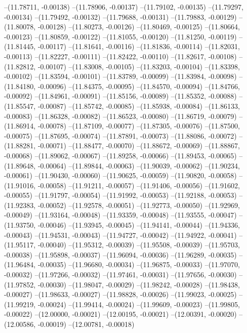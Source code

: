 --(11.78711, -0.00138)
--(11.78906, -0.00137)
--(11.79102, -0.00135)
--(11.79297, -0.00134)
--(11.79492, -0.00132)
--(11.79688, -0.00131)
--(11.79883, -0.00129)
--(11.80078, -0.00128)
--(11.80273, -0.00126)
--(11.80469, -0.00125)
--(11.80664, -0.00123)
--(11.80859, -0.00122)
--(11.81055, -0.00120)
--(11.81250, -0.00119)
--(11.81445, -0.00117)
--(11.81641, -0.00116)
--(11.81836, -0.00114)
--(11.82031, -0.00113)
--(11.82227, -0.00111)
--(11.82422, -0.00110)
--(11.82617, -0.00108)
--(11.82812, -0.00107)
--(11.83008, -0.00105)
--(11.83203, -0.00104)
--(11.83398, -0.00102)
--(11.83594, -0.00101)
--(11.83789, -0.00099)
--(11.83984, -0.00098)
--(11.84180, -0.00096)
--(11.84375, -0.00095)
--(11.84570, -0.00094)
--(11.84766, -0.00092)
--(11.84961, -0.00091)
--(11.85156, -0.00089)
--(11.85352, -0.00088)
--(11.85547, -0.00087)
--(11.85742, -0.00085)
--(11.85938, -0.00084)
--(11.86133, -0.00083)
--(11.86328, -0.00082)
--(11.86523, -0.00080)
--(11.86719, -0.00079)
--(11.86914, -0.00078)
--(11.87109, -0.00077)
--(11.87305, -0.00076)
--(11.87500, -0.00075)
--(11.87695, -0.00074)
--(11.87891, -0.00073)
--(11.88086, -0.00072)
--(11.88281, -0.00071)
--(11.88477, -0.00070)
--(11.88672, -0.00069)
--(11.88867, -0.00068)
--(11.89062, -0.00067)
--(11.89258, -0.00066)
--(11.89453, -0.00065)
--(11.89648, -0.00064)
--(11.89844, -0.00063)
--(11.90039, -0.00062)
--(11.90234, -0.00061)
--(11.90430, -0.00060)
--(11.90625, -0.00059)
--(11.90820, -0.00058)
--(11.91016, -0.00058)
--(11.91211, -0.00057)
--(11.91406, -0.00056)
--(11.91602, -0.00055)
--(11.91797, -0.00054)
--(11.91992, -0.00053)
--(11.92188, -0.00053)
--(11.92383, -0.00052)
--(11.92578, -0.00051)
--(11.92773, -0.00050)
--(11.92969, -0.00049)
--(11.93164, -0.00048)
--(11.93359, -0.00048)
--(11.93555, -0.00047)
--(11.93750, -0.00046)
--(11.93945, -0.00045)
--(11.94141, -0.00044)
--(11.94336, -0.00043)
--(11.94531, -0.00043)
--(11.94727, -0.00042)
--(11.94922, -0.00041)
--(11.95117, -0.00040)
--(11.95312, -0.00039)
--(11.95508, -0.00039)
--(11.95703, -0.00038)
--(11.95898, -0.00037)
--(11.96094, -0.00036)
--(11.96289, -0.00035)
--(11.96484, -0.00035)
--(11.96680, -0.00034)
--(11.96875, -0.00033)
--(11.97070, -0.00032)
--(11.97266, -0.00032)
--(11.97461, -0.00031)
--(11.97656, -0.00030)
--(11.97852, -0.00030)
--(11.98047, -0.00029)
--(11.98242, -0.00028)
--(11.98438, -0.00027)
--(11.98633, -0.00027)
--(11.98828, -0.00026)
--(11.99023, -0.00025)
--(11.99219, -0.00024)
--(11.99414, -0.00024)
--(11.99609, -0.00023)
--(11.99805, -0.00022)
--(12.00000, -0.00021)
--(12.00195, -0.00021)
--(12.00391, -0.00020)
--(12.00586, -0.00019)
--(12.00781, -0.00018)
